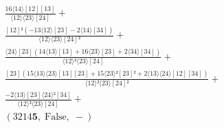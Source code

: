 \documentclass[varwidth, border=5pt]{standalone}
\begin{document}
\begin{my}
$\begin{gathered}
\scriptscriptstyle\frac{16⟨14⟩[12][13]}{⟨12⟩⟨23⟩[24]} +\\
\scriptscriptstyle\frac{[12]²(-13⟨12⟩[23]-2⟨14⟩[34])}{⟨12⟩⟨23⟩[24]²} +\\
\scriptscriptstyle\frac{⟨24⟩[23](14⟨13⟩[13]+16⟨23⟩[23]+2⟨34⟩[34])}{⟨12⟩²⟨23⟩[24]} +\\
\scriptscriptstyle\frac{[23](15⟨13⟩⟨23⟩[13][23]+15⟨23⟩²[23]²+2⟨13⟩⟨24⟩[12][34])}{⟨12⟩²⟨23⟩[24]²} +\\
\scriptscriptstyle\frac{-2⟨13⟩[23]⟨24⟩²[34]}{⟨12⟩³⟨23⟩[24]} +\\
\scriptscriptstyle(3214𝟓,\;\text{False},\;-) \phantom{+}
\end{gathered}$
\end{my}
\end{document}
